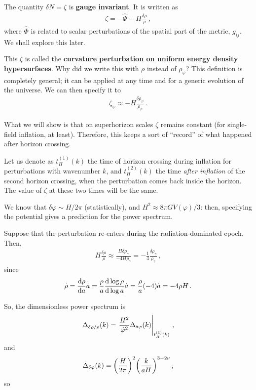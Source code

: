 \documentclass[main.tex]{subfiles}
\begin{document}
The quantity \(\delta N = \zeta\) is \textbf{gauge invariant}. It is written as 
%
\begin{align}
\zeta = - \hat{\Phi} - H \frac{ \delta \rho }{\dot{\rho} }
\,,
\end{align}
%
where \(\hat{\Phi}\) is related to scalar perturbations  of the spatial part of the metric, \(g_{ij}\). We shall explore this later. 

This \(\zeta\) is called the \textbf{curvature perturbation on uniform energy density hypersurfaces}.
Why did we write this with \(\rho \) instead of \(\rho _\varphi \)? This definition is completely general; it can be applied at any time and for a generic evolution of the universe. 
We can then specify it to 
%
\begin{align}
\zeta_\varphi \approx - H \frac{ \delta \rho _\varphi }{\dot{\rho}_\varphi }
\,.
\end{align}

What we will show is that on superhorizon scales \(\zeta\) remains constant (for single-field inflation, at least). 
Therefore, this keeps a sort of ``record'' of what happened after horizon crossing.

Let us denote as \(t^{(1)}_H(k)\) the time of horizon crossing during inflation for perturbations with wavenumber \(k\), and \(t^{(2)}_H(k)\) the time \emph{after inflation} of the second horizon crossing, when the perturbation comes back inside the horizon.  
The value of \(\zeta \) at these two times will be the same.

We know that \(\delta \varphi \sim H / 2 \pi \) (statistically), and \(H^2 \approx 8 \pi G V(\varphi ) /3\): then, specifying the potential gives a prediction for the power spectrum. 

Suppose that the perturbation re-enters during the radiation-dominated epoch. Then, 
%
\begin{align}
H \frac{ \delta \rho }{\dot{\rho} } \approx \frac{H \delta \rho _\gamma }{-4 H \rho _\gamma } = - \frac{1}{4}\frac{ \delta \rho _\gamma }{\rho _\gamma }
\,,
\end{align}
%
since 
%
\begin{align}
\dot{\rho} = \dv{\rho }{a} \dot{a} = \frac{\rho}{a} \dv{\log \rho }{\log a} \dot{a} = \frac{\rho}{a} (-4) \dot{a} = - 4 \rho H
\,.
\end{align}
%

So, the dimensionless power spectrum is 
%
\begin{align}
\Delta_{ \delta \rho / \rho } (k)= 
\eval{\frac{H^2}{ \dot{\varphi}^2} \Delta_{ \delta \varphi } (k)}_{t^{(1)}_H (k)} 
\,,
\end{align}
%
and 
%
\begin{align}
\Delta_{ \delta \varphi } (k) = \qty( \frac{H}{ 2 \pi })^2 \qty(\frac{k}{aH})^{3-2 \nu }
\,,
\end{align}
%
so 

\end{document}
